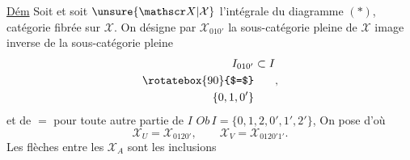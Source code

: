 \uline{Dém} Soit
et soit $\unsure{\mathscr X|\mathcal X}$ l'intégrale du diagramme $(*)$, catégorie fibrée sur $\mathscr X$. On désigne par $\mathscr X_{010'}$ la sous-catégorie pleine de $\mathscr X$ image inverse de la sous-catégorie pleine 
\[
 \begin{aligned}
 I_{010'}&\subset I\\
 \rotatebox{90}{$=$}&\\
 \{0,1,0'\}&
 \end{aligned},
\]
et de $=$ pour toute autre partie  de  $I$ $Ob\,I=\{0,1,2,0',1',2'\}$,   On pose
d'où 
\[
 \mathscr X_U=\mathscr X_{0120'},\qquad \mathscr X_V=\mathscr X_{0120'1'}.
\]
Les flèches entre les $\mathscr X_A$ sont les inclusions



